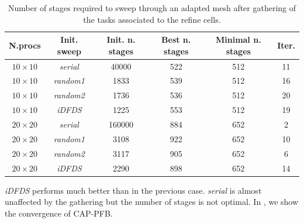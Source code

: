 \documentclass{mc2015}
\renewcommand{\(}{\left(}
\renewcommand{\)}{\right)}
\renewcommand{\[}{\left[}
\renewcommand{\]}{\right]}
\begin{document}
\begin{table}[H]
  \begin{center}
    \caption{Number of stages required to sweep through an adapted mesh after
    gathering of the tasks associated to the refine cells.}
    \begin{tabular}{|c|c|c|c|c|c|}
      \hline
      N.procs & Init. sweep & Init. n. stages & Best n. stages & Minimal n. stages & Iter. \\
      \hline
      $10 \times 10$ &  \emph{serial} &  40000 &  522 & 512 & 11 \\
      $10 \times 10$ & \emph{random1} &   1833 &  539 & 512 & 16 \\
      $10 \times 10$ & \emph{random2} &   1736 &  536 & 512 & 20 \\
      $10 \times 10$ &   \emph{iDFDS} &   1225 &  553 & 512 & 19 \\
      $20 \times 20$ &  \emph{serial} & 160000 &  884 & 652 &  2 \\
      $20 \times 20$ & \emph{random1} &   3108 &  922 & 652 & 10 \\
      $20 \times 20$ & \emph{random2} &   3117 &  905 & 652 &  6 \\  
      $20 \times 20$ &   \emph{iDFDS} &   2290 &  898 & 652 & 14 \\
      \hline
    \end{tabular}
    \label{band_2}
  \end{center}
\end{table}

\emph{iDFDS} performs much better than in the previous case. \emph{serial} is
almost unaffected by the gathering but the number of stages is not optimal.
In , we show the convergence of CAP-PFB. 
\end{document}
